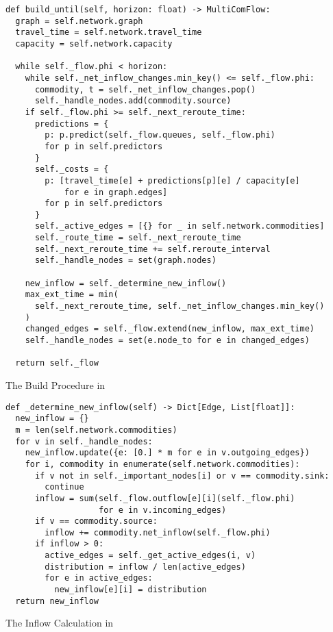 \begin{algorithm}
  \begin{verbatim}
def build_until(self, horizon: float) -> MultiComFlow:
  graph = self.network.graph
  travel_time = self.network.travel_time
  capacity = self.network.capacity

  while self._flow.phi < horizon:
    while self._net_inflow_changes.min_key() <= self._flow.phi:
      commodity, t = self._net_inflow_changes.pop()
      self._handle_nodes.add(commodity.source)
    if self._flow.phi >= self._next_reroute_time:
      predictions = {
        p: p.predict(self._flow.queues, self._flow.phi)
        for p in self.predictors
      }
      self._costs = {
        p: [travel_time[e] + predictions[p][e] / capacity[e]
            for e in graph.edges]
        for p in self.predictors
      }
      self._active_edges = [{} for _ in self.network.commodities]
      self._route_time = self._next_reroute_time
      self._next_reroute_time += self.reroute_interval
      self._handle_nodes = set(graph.nodes)

    new_inflow = self._determine_new_inflow()
    max_ext_time = min(
      self._next_reroute_time, self._net_inflow_changes.min_key()
    )
    changed_edges = self._flow.extend(new_inflow, max_ext_time)
    self._handle_nodes = set(e.node_to for e in changed_edges)

  return self._flow
\end{verbatim}
\caption{The Build Procedure in }
\label{alg:extend-flow-builder}
\end{algorithm}

\begin{algorithm}
  \begin{verbatim}
def _determine_new_inflow(self) -> Dict[Edge, List[float]]:
  new_inflow = {}
  m = len(self.network.commodities)
  for v in self._handle_nodes:
    new_inflow.update({e: [0.] * m for e in v.outgoing_edges})
    for i, commodity in enumerate(self.network.commodities):
      if v not in self._important_nodes[i] or v == commodity.sink:
        continue
      inflow = sum(self._flow.outflow[e][i](self._flow.phi)
                   for e in v.incoming_edges)
      if v == commodity.source:
        inflow += commodity.net_inflow(self._flow.phi)
      if inflow > 0:
        active_edges = self._get_active_edges(i, v)
        distribution = inflow / len(active_edges)
        for e in active_edges:
          new_inflow[e][i] = distribution
  return new_inflow
\end{verbatim}
\caption{The Inflow Calculation in }
\label{alg:determine-new-inflow}
\end{algorithm}
